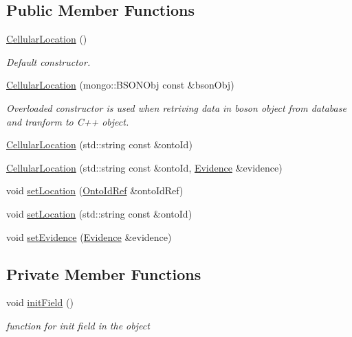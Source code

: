 \subsection*{Public Member Functions}
\begin{DoxyCompactItemize}
\item 
\hyperlink{classunisys_1_1CellularLocation_a46ed7fca62bedc9f3ac621c79eb128bb}{Cellular\-Location} ()
\begin{DoxyCompactList}\small\item\em Default constructor. \end{DoxyCompactList}\item 
\hyperlink{classunisys_1_1CellularLocation_aa9065ea0a1430e686f45b6c124bd1e5c}{Cellular\-Location} (mongo\-::\-B\-S\-O\-N\-Obj const \&bson\-Obj)
\begin{DoxyCompactList}\small\item\em Overloaded constructor is used when retriving data in boson object from database and tranform to C++ object. \end{DoxyCompactList}\item 
\hyperlink{classunisys_1_1CellularLocation_a20b1883b266c82b190ffcddf65b7bd06}{Cellular\-Location} (std\-::string const \&onto\-Id)
\item 
\hyperlink{classunisys_1_1CellularLocation_aa53a8503c5194bdf73754eb43d85679f}{Cellular\-Location} (std\-::string const \&onto\-Id, \hyperlink{classunisys_1_1Evidence}{Evidence} \&evidence)
\item 
void \hyperlink{classunisys_1_1CellularLocation_ac9293b818286bb95c9457dbe5c0d8b2a}{set\-Location} (\hyperlink{classunisys_1_1OntoIdRef}{Onto\-Id\-Ref} \&onto\-Id\-Ref)
\item 
void \hyperlink{classunisys_1_1CellularLocation_a67cdc4c13710e2abbe206883eda1db78}{set\-Location} (std\-::string const \&onto\-Id)
\item 
void \hyperlink{classunisys_1_1CellularLocation_ae19abcc07b3bee3a133125dc550f4414}{set\-Evidence} (\hyperlink{classunisys_1_1Evidence}{Evidence} \&evidence)
\end{DoxyCompactItemize}
\subsection*{Private Member Functions}
\begin{DoxyCompactItemize}
\item 
void \hyperlink{classunisys_1_1CellularLocation_a3aa4c3ebf735ecf9672d0986a63b1dfe}{init\-Field} ()
\begin{DoxyCompactList}\small\item\em function for init field in the object \end{DoxyCompactList}\end{DoxyCompactItemize}

